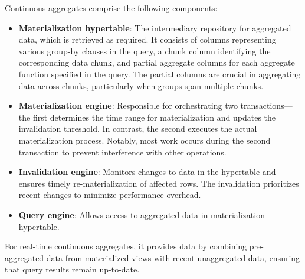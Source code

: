 
Continuous aggregates comprise the following components:

\begin{itemize}
    \item \textbf{Materialization hypertable}: The intermediary repository for aggregated data, which is retrieved as required. It consists of columns representing various group-by clauses in the query, a chunk column identifying the corresponding data chunk, and partial aggregate columns for each aggregate function specified in the query. The partial columns are crucial in aggregating data across chunks, particularly when groups span multiple chunks.

    \item \textbf{Materialization engine}: Responsible for orchestrating two transactions— the first determines the time range for materialization and updates the invalidation threshold. In contrast, the second executes the actual materialization process. Notably, most work occurs during the second transaction to prevent interference with other operations.

    \item \textbf{Invalidation engine}: Monitors changes to data in the hypertable and ensures timely re-materialization of affected rows. The invalidation prioritizes recent changes to minimize performance overhead.

    \item \textbf{Query engine}: Allows access to aggregated data in materialization hypertable.
\end{itemize}

For real-time continuous aggregates, it provides data by combining pre-aggregated data from materialized views with recent unaggregated data, ensuring that query results remain up-to-date.


